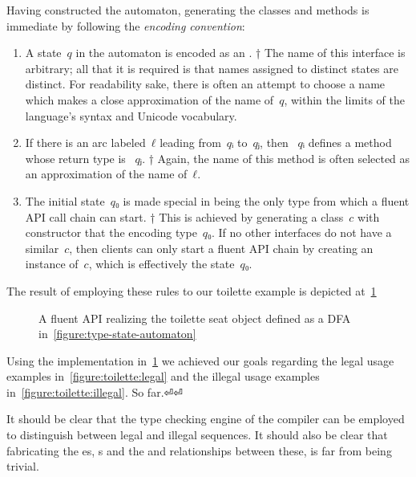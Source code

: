 Having constructed the automaton, generating the classes and methods is immediate
by following the \emph{encoding convention}:
\begin{enumerate}
  \item A state~$q$ in the automaton is encoded as an .%
        †{%
          The name of this interface is arbitrary; all that it is required is that
          names assigned to distinct states are distinct.
          For readability sake, there is often an attempt to choose a name
          which makes a close approximation of the name of~$q$, within
          the limits of the language's syntax and Unicode vocabulary.
        }
  \item If there is an arc labeled~$ℓ$ leading from~$qᵢ$ to~$qⱼ$,
        then ~$qᵢ$ defines a
        method whose return type is ~$qⱼ$.%
        †{%
          Again, the name of this method is often selected as an approximation of the name of~$ℓ$.
        }
  \item The initial state~$q₀$ is made special in being the only type from
        which a fluent API call chain can start.%
        †{%
          This is achieved by generating a class~$c$ with 
          constructor that  the  encoding type~$q₀$.
          If no other interfaces do not have a similar~$c$, then clients can only
          start a fluent API chain by creating an instance of~$c$, which is
          effectively the state~$q₀$.
        }
\end{enumerate}

The result of employing these rules to our toilette example is depicted at~\cref{figure:toilette-types} 

\begin{figure}
  \caption{\label{figure:toilette-types}
    A fluent API realizing the toilette seat object defined as a DFA
    in~\cref{figure:type-state-automaton}} 
\end{figure}

Using the implementation in~\cref{figure:toilette-types} we achieved
our goals regarding the legal usage examples in~\cref{figure:toilette:legal}
  and the illegal usage examples in~\cref{figure:toilette:illegal}.
So far.⏎⏎

It should be clear that the type checking engine of the compiler can
be employed to distinguish between legal and illegal sequences.
It should also be clear that fabricating the es, s
and the  and  relationships between these, is
far from being trivial.

